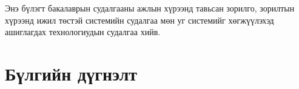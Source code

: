 Энэ бүлэгт бакалаврын судалгааны ажлын хүрээнд тавьсан зорилго, зорилтын хүрээнд ижил 
төстэй системийн судалгаа мөн уг системийг хөгжүүлэхэд ашиглагдах технологиудын судалгаа
хийв.





\section{Бүлгийн дүгнэлт}


